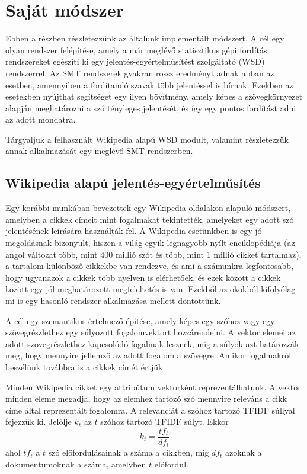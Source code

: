 \section{Saját módszer} \label{sec:new_method}

Ebben a részben részletezzünk az általunk implementált módszert. A cél egy olyan rendszer felépítése, amely a már meglévő statisztikus gépi fordítás rendszereket egészíti ki egy jelentés-egyértelműsítést szolgáltató (WSD) rendszerrel. Az SMT rendszerek gyakran rossz eredményt adnak abban az esetben, amennyiben a fordítandó szavak több jelentéssel is bírnak. Ezekben az esetekben nyújthat segítséget egy ilyen bővítmény, amely képes a szövegkörnyezet alapján meghatározni a szó tényleges jelentését, és így egy pontos fordítást adni az adott mondatra. 

Tárgyaljuk a felhasznált Wikipedia alapú WSD modult, valamint részletezzük annak alkalmazását egy meglévő SMT rendszerben.

\subsection{Wikipedia alapú jelentés-egyértelműsítés} \label{sec:WikiWSD}

Egy korábbi munkában \cite{Gabrilovich:2007:CSR} bevezettek egy Wikipedia oldalakon alapuló módszert, amelyben a cikkek címeit mint fogalmakat tekintették, amelyeket egy adott szó jelentésének leírására használták fel. A Wikipedia esetünkben is egy jó megoldásnak bizonyult, hiszen a világ egyik legnagyobb nyílt enciklopédiája (az angol változat több, mint 400 millió szót és több, mint 1 millió cikket tartalmaz), a tartalom különböző cikkekbe van rendezve, és ami a számunkra legfontosabb, hogy ugyanazok a cikkek több nyelven is elérhetőek, és ezek között a cikkek között egy jól meghatározott megfeleltetés is van. Ezekből az okokból kifolyólag mi is egy hasonló rendszer alkalmazása mellett döntöttünk.

A cél egy szemantikus értelmező építése, amely képes egy szóhoz vagy egy szövegrészlethez egy súlyozott fogalomvektort hozzárendelni. A vektor elemei az adott szövegrészlethez kapcsolódó fogalmak lesznek, míg a súlyok azt határozzák meg, hogy mennyire jellemző az adott fogalom a szövegre. Amikor fogalmakról beszélünk továbbra is a cikkek címét értjük. 

Minden Wikipedia cikket egy attribútum vektorként reprezentálhatunk. A vektor minden eleme megadja, hogy az elemhez tartozó szó mennyire releváns a cikk címe által reprezentált fogalomra. A relevanciát a szóhoz tartozó TFIDF súllyal fejezzük ki. Jelölje $k_t$ az $t$ szóhoz tartozó TFIDF súlyt. Ekkor 
\begin{equation}
	k_t = \frac{tf_t}{df_t}
\end{equation}
ahol $tf_t$ a $t$ szó előfordulásainak a száma a cikkben, míg $df_t$ azoknak a dokumentumoknak a száma, amelyben $t$ előfordul.

